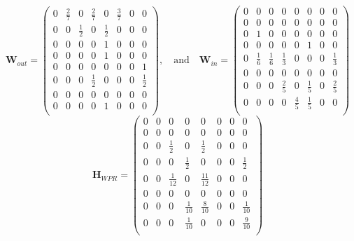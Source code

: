 \documentclass[11pt]{report}
\begin{document}
{\[\textbf{W}_{out}=\left(
\begin{array}{cccccccc}
0 & \frac{2}{7} & 0 & \frac{2}{7} & 0 &\frac{3}{7} & 0 & 0 \\
0 & 0 &\frac{1}{2}& 0 &\frac{1}{2}& 0 & 0 & 0\\
0 & 0 & 0 & 0 & 1 & 0 & 0 & 0\\
0 & 0 & 0 & 0 & 1 & 0 & 0 & 0\\
0 & 0 & 0 & 0 & 0 & 0 & 0 & 1\\
0 & 0 & 0 & \frac{1}{2} & 0 & 0 & 0 & \frac{1}{2} \\
0 & 0 & 0 & 0 & 0 & 0 & 0 & 0\\
0 & 0 & 0 & 0 & 1 & 0 & 0 & 0\\
\end{array}
\right) \mathrm{,}\quad\mathrm{and}\quad\textbf{W}_{in}=\left(
\begin{array}{cccccccc}
0 & 0 & 0 & 0 & 0 & 0 & 0 & 0 \\
0 & 0 & 0 & 0 & 0 & 0 & 0 & 0\\
0 & 1 & 0 & 0 & 0 & 0 & 0 & 0\\
0 & 0 & 0 & 0 & 0 & 1 & 0 & 0\\
0 & \frac{1}{6} & \frac{1}{6} & \frac{1}{3} & 0 & 0 & 0 & \frac{1}{3}\\
0 & 0 & 0 & 0 & 0 & 0 & 0 & 0 \\
0 & 0 & 0 & \frac{2}{5} & 0 & \frac{1}{5} & 0 & \frac{2}{5}\\
0 & 0 & 0 & 0 & \frac{4}{5} & \frac{1}{5} & 0 & 0\\
\end{array}
\right)	\]
\[\textbf{H}_{WPR}=\left(
\begin{array}{cccccccc}
0 & 0 & 0 & 0 & 0 & 0 & 0 & 0 \\
0 & 0 & 0 & 0 & 0 & 0 & 0 & 0\\
0 & 0 & \frac{1}{2} & 0 & \frac{1}{2} & 0 & 0 & 0\\
0 & 0 & 0 & \frac{1}{2} & 0 & 0 & 0 & \frac{1}{2}\\
0 & 0 & \frac{1}{12} & 0 & \frac{11}{12} & 0 & 0 & 0\\
0 & 0 & 0 & 0 & 0 & 0 & 0 & 0 \\
0 & 0 & 0 & \frac{1}{10} & \frac{8}{10} & 0 & 0 & \frac{1}{10}\\
0 & 0 & 0 & \frac{1}{10} & 0 & 0 & 0 & \frac{9}{10}\\
\end{array}
\right)	\]

}
\end{document}
